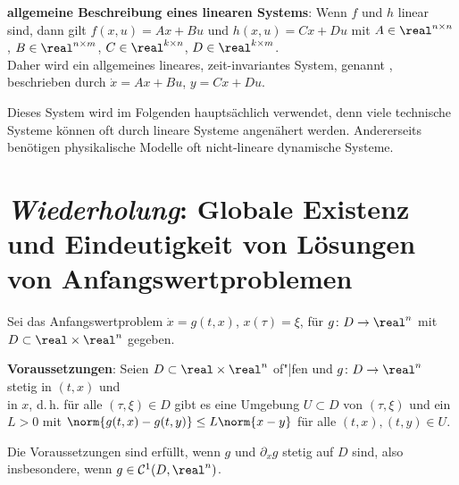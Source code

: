 \linie

\textbf{allgemeine Beschreibung eines linearen Systems}:
Wenn $f$ und $h$ linear sind, dann gilt
$f(x, u) = Ax + Bu$ und $h(x, u) = Cx + Du$
mit $A \in \real^{n \times n}$, $B \in \real^{n \times m}$, $C \in \real^{k \times n}$,
$D \in \real^{k \times m}$.\\
Daher wird ein allgemeines lineares, zeit-invariantes System,
genannt , beschrieben durch
$\dot{x} = Ax + Bu$, $y = Cx + Du$.

Dieses System wird im Folgenden hauptsächlich verwendet,
denn viele technische Systeme können oft durch lineare Systeme angenähert werden.
Andererseits benötigen physikalische Modelle oft nicht-lineare dynamische Systeme.

\pagebreak

\section{%
    \emph{Wiederholung}: Globale Existenz und Eindeutigkeit von Lösungen von Anfangswertproblemen%
}

Sei das Anfangswertproblem $\dot{x} = g(t, x)$, $x(\tau) = \xi$,
für $g\colon D \rightarrow \real^n$ mit $D \subset \real \times \real^n$ gegeben.

\textbf{Voraussetzungen}:
Seien $D \subset \real \times \real^n$ of"|fen und $g\colon D \rightarrow \real^n$
stetig in $(t, x)$ und\\
 in $x$, d.\,h.
für alle $(\tau, \xi) \in D$ gibt es eine Umgebung $U \subset D$ von $(\tau, \xi)$
und ein $L > 0$ mit
$\norm{g(t, x) - g(t, y)} \le L \norm{x - y}$ für alle $(t, x), (t, y) \in U$.

Die Voraussetzungen sind erfüllt, wenn $g$ und $\partial_x g$ stetig auf $D$ sind,
also insbesondere, wenn $g \in \C^1(D, \real^n)$.

\linie

